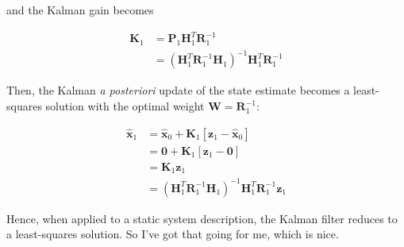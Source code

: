and the Kalman gain becomes

\begin{equation*}
    \begin{aligned}
        \mathbf{K}_1 &= \mathbf{P}_1 \mathbf{H}_1^T \mathbf{R}_1^{-1} \\
        &= \left( \mathbf{H}_1^T \mathbf{R}_1^{-1} \mathbf{H}_1 \right)^{-1} \mathbf{H}_1^T \mathbf{R}_1^{-1}
    \end{aligned}
\end{equation*}

Then, the Kalman \textit{a posteriori} update of the state estimate becomes a least-squares
solution with the optimal weight $\mathbf{W} = \mathbf{R}_1^{-1}$:

\begin{equation*}
    \begin{aligned}
        \hat{\mathbf{x}}_1 &= \hat{\mathbf{x}}_0 + \mathbf{K}_1 \left[ \mathbf{z}_1 - \hat{\mathbf{x}}_0 \right] \\
        &= \mathbf{0} + \mathbf{K}_1 \left[ \mathbf{z}_1 - \mathbf{0} \right] \\
        &= \mathbf{K}_1 \mathbf{z}_1 \\
        &= \left( \mathbf{H}_1^T \mathbf{R}_1^{-1} \mathbf{H}_1 \right)^{-1} \mathbf{H}_1^T \mathbf{R}_1^{-1} \mathbf{z}_1
    \end{aligned}
\end{equation*}

Hence, when applied to a static system description, the Kalman filter reduces to a
least-squares solution. So I’ve got that going for me, which is nice.
